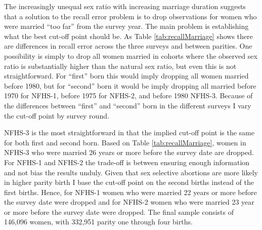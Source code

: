 \documentclass[12pt,letterpaper]{article}
\begin{document}
The increasingly unequal sex ratio with increasing marriage duration suggests that
a solution to the recall error problem is to drop observations for 
women who were married ``too far'' from the survey year.
The main problem is establishing what the best cut-off point should be.
As Table \ref{tab:recallMarriage} shows there are differences in recall error across the
three surveys and between parities.
One possibility is simply to drop all women married in cohorts where the observed
sex ratio is substantially higher than the natural sex ratio, but even this is not
straightforward.
For ``first'' born this would imply dropping all women married before 1980, but
for ``second'' born it would be imply dropping all married before 1970 for NFHS-1, before 1975 
for NFHS-2, and before 1980 NFHS-3.
Because of the differences between ``first'' and ``second'' born in the different surveys
I vary the cut-off point by survey round.

NFHS-3 is the most straightforward in that the implied cut-off point is the same for
both first and second born.
Based on Table \ref{tab:recallMarriage}, women in NFHS-3 who were married 26 years or
more before the survey date are dropped.
For NFHS-1 and NFHS-2 the trade-off is between ensuring enough information and not bias 
the results unduly.
Given that sex selective abortions are more likely in higher parity birth I base the
cut-off point on the second births instead of the first births.
Hence, for NFHS-1 women who were married 22 years or more before the survey date 
were dropped and for NFHS-2 women who were married 23 year or more before the survey date 
were dropped.
The final sample consists of 146,096 women, with 332,951 
parity one through four births.




\end{document}
